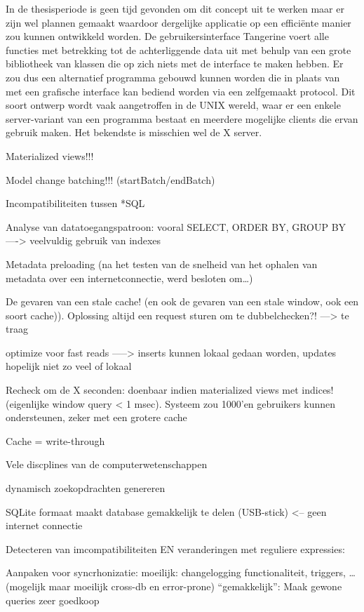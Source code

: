 In de thesisperiode is geen tijd gevonden om dit concept uit te werken maar er zijn wel plannen gemaakt waardoor dergelijke
applicatie op een effici\"ente manier zou kunnen ontwikkeld worden. De gebruikersinterface Tangerine voert alle functies met betrekking tot de achterliggende data uit met behulp van een grote bibliotheek
van klassen die op zich niets met de interface te maken hebben. Er zou dus een alternatief programma gebouwd kunnen worden die in plaats van met een grafische interface kan bediend worden
via een zelfgemaakt protocol. Dit soort ontwerp wordt vaak aangetroffen in de UNIX wereld, waar er een enkele server-variant van een programma bestaat en meerdere mogelijke clients die ervan gebruik maken.
Het bekendste is misschien wel de X server.

Materialized views!!!

Model change batching!!! (startBatch/endBatch)

Incompatibiliteiten tussen *SQL

Analyse van datatoegangspatroon: vooral SELECT, ORDER BY, GROUP BY ---->
veelvuldig gebruik van indexes

Metadata preloading (na het testen van de snelheid van het ophalen van metadata
over een internetconnectie, werd besloten om\ldots)

De gevaren van een stale cache! (en ook de gevaren van een stale window, ook
een soort cache)). Oplossing altijd een request sturen om te dubbelchecken?!
---> te traag

optimize voor fast reads -----> inserts kunnen lokaal gedaan worden, updates hopelijk niet zo veel of lokaal

Recheck om de X seconden: doenbaar indien materialized views met indices!
(eigenlijke window query < 1 msec). Systeem zou 1000'en gebruikers kunnen
ondersteunen, zeker met een grotere cache

Cache = write-through

Vele discplines van de computerwetenschappen


dynamisch zoekopdrachten genereren

SQLite formaat maakt database gemakkelijk te delen (USB-stick) <-- geen internet
connectie

Detecteren van imcompatibiliteiten EN veranderingen met reguliere
expressies:

Aanpaken voor syncrhonizatie:
moeilijk: changelogging functionaliteit, triggers, \ldots (mogelijk maar
moeilijk cross-db en error-prone)
``gemakkelijk'': Maak gewone queries zeer goedkoop

